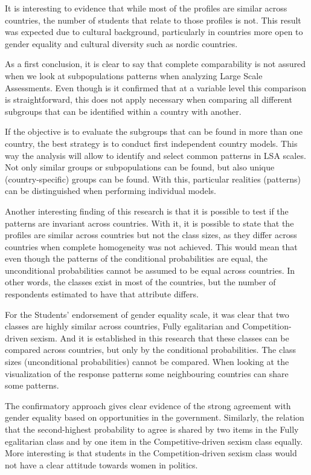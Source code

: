 \documentclass[12pt,a4paper,oneside]{reedthesis}
\begin{document}
It is interesting to evidence that while most of the profiles are similar across countries, the number of students that relate to those profiles is not. This result was expected due to cultural background, particularly in countries more open to gender equality and cultural diversity such as nordic countries.

As a first conclusion, it is clear to say that complete comparability is not assured when we look at subpopulations patterns when analyzing Large Scale Assessments. Even though is it confirmed that at a variable level this comparison is straightforward, this does not apply necessary when comparing all different subgroups that can be identified within a country with another.

If the objective is to evaluate the subgroups that can be found in more than one country, the best strategy is to conduct first independent country models. This way the analysis will allow to identify and select common patterns in LSA scales. Not only similar groups or subpopulations can be found, but also unique (country-specific) groups can be found. With this, particular realities (patterns) can be distinguished when performing individual models.

Another interesting finding of this research is that it is possible to test if the patterns are invariant across countries. With it, it is possible to state that the profiles are similar across countries but not the class sizes, as they differ across countries when complete homogeneity was not achieved. This would mean that even though the patterns of the conditional probabilities are equal, the unconditional probabilities cannot be assumed to be equal across countries. In other words, the classes exist in most of the countries, but the number of respondents estimated to have that attribute differs.

For the Students' endorsement of gender equality scale, it was clear that two classes are highly similar across countries, Fully egalitarian and Competition-driven sexism. And it is established in this research that these classes can be compared across countries, but only by the conditional probabilities. The class sizes (unconditional probabilities) cannot be compared. When looking at the visualization of the response patterns some neighbouring countries can share some patterns.

The confirmatory approach gives clear evidence of the strong agreement with gender equality based on opportunities in the government. Similarly, the relation that the second-highest probability to agree is shared by two items in the Fully egalitarian class and by one item in the Competitive-driven sexism class equally. More interesting is that students in the Competition-driven sexism class would not have a clear attitude towards women in politics.
\end{document}
